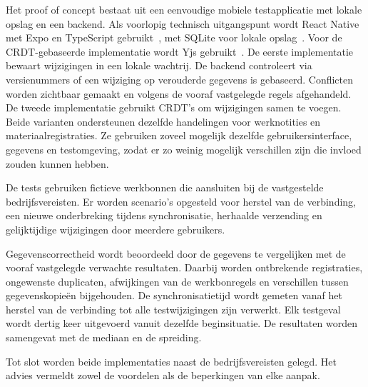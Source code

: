 Het proof of concept bestaat uit een eenvoudige mobiele testapplicatie met lokale opslag en een backend.
Als voorlopig technisch uitgangspunt wordt React Native met Expo en
TypeScript gebruikt~\autocite{ReactNativeTypeScript}, met SQLite voor lokale opslag~\autocite{ExpoSQLite}. Voor de
CRDT-gebaseerde implementatie wordt Yjs gebruikt~\autocite{YjsDocumentation}. De eerste implementatie bewaart wijzigingen in een lokale
wachtrij. De backend controleert via versienummers of een wijziging op verouderde gegevens is gebaseerd. Conflicten worden
zichtbaar gemaakt en volgens de vooraf vastgelegde regels afgehandeld. De tweede implementatie gebruikt CRDT's om wijzigingen
samen te voegen. Beide varianten ondersteunen dezelfde handelingen voor werknotities en materiaalregistraties. Ze gebruiken
zoveel mogelijk dezelfde gebruikersinterface, gegevens en testomgeving, zodat er zo weinig mogelijk verschillen zijn die invloed zouden kunnen hebben.

De tests gebruiken fictieve werkbonnen die aansluiten bij de vastgestelde bedrijfsvereisten. Er worden scenario's opgesteld voor
herstel van de verbinding, een nieuwe onderbreking tijdens synchronisatie, herhaalde verzending en gelijktijdige
wijzigingen door meerdere gebruikers.

Gegevenscorrectheid wordt beoordeeld door de gegevens te vergelijken met de vooraf vastgelegde verwachte resultaten.
Daarbij worden ontbrekende registraties, ongewenste duplicaten, afwijkingen van de werkbonregels en verschillen tussen gegevenskopieën
bijgehouden. De synchronisatietijd wordt gemeten
vanaf het herstel van de verbinding tot alle testwijzigingen zijn verwerkt. Elk testgeval wordt dertig keer uitgevoerd vanuit dezelfde
beginsituatie. De resultaten worden samengevat met de mediaan en de spreiding.

Tot slot worden beide implementaties naast de bedrijfsvereisten gelegd. Het advies vermeldt zowel de voordelen als de beperkingen
van elke aanpak.


